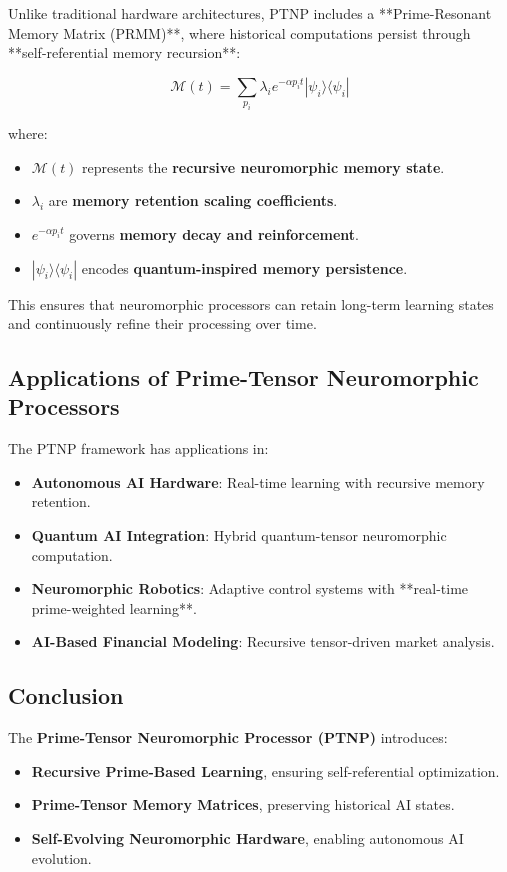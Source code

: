 \documentclass{article}
\theoremstyle{plain}
\theoremstyle{plain}
\theoremstyle{definition}
\theoremstyle{remark}
\begin{document}
Unlike traditional hardware architectures, PTNP includes a **Prime-Resonant Memory Matrix (PRMM)**, where historical computations persist through **self-referential memory recursion**:

\begin{equation}
\mathcal{M}(t) = \sum_{p_i} \lambda_i e^{- \alpha p_i t} |\psi_i\rangle \langle \psi_i |
\end{equation}

where:
\begin{itemize}
    \item $\mathcal{M}(t)$ represents the \textbf{recursive neuromorphic memory state}.
    \item $\lambda_i$ are \textbf{memory retention scaling coefficients}.
    \item $e^{- \alpha p_i t}$ governs \textbf{memory decay and reinforcement}.
    \item $|\psi_i\rangle \langle \psi_i |$ encodes \textbf{quantum-inspired memory persistence}.
\end{itemize}

This ensures that neuromorphic processors can retain long-term learning states and continuously refine their processing over time.

\subsection{Applications of Prime-Tensor Neuromorphic Processors}

The PTNP framework has applications in:
\begin{itemize}
    \item \textbf{Autonomous AI Hardware}: Real-time learning with recursive memory retention.
    \item \textbf{Quantum AI Integration}: Hybrid quantum-tensor neuromorphic computation.
    \item \textbf{Neuromorphic Robotics}: Adaptive control systems with **real-time prime-weighted learning**.
    \item \textbf{AI-Based Financial Modeling}: Recursive tensor-driven market analysis.
\end{itemize}

\subsection{Conclusion}

The \textbf{Prime-Tensor Neuromorphic Processor (PTNP)} introduces:
\begin{itemize}
    \item \textbf{Recursive Prime-Based Learning}, ensuring self-referential optimization.
    \item \textbf{Prime-Tensor Memory Matrices}, preserving historical AI states.
    \item \textbf{Self-Evolving Neuromorphic Hardware}, enabling autonomous AI evolution.
\end{itemize}
\end{document}
